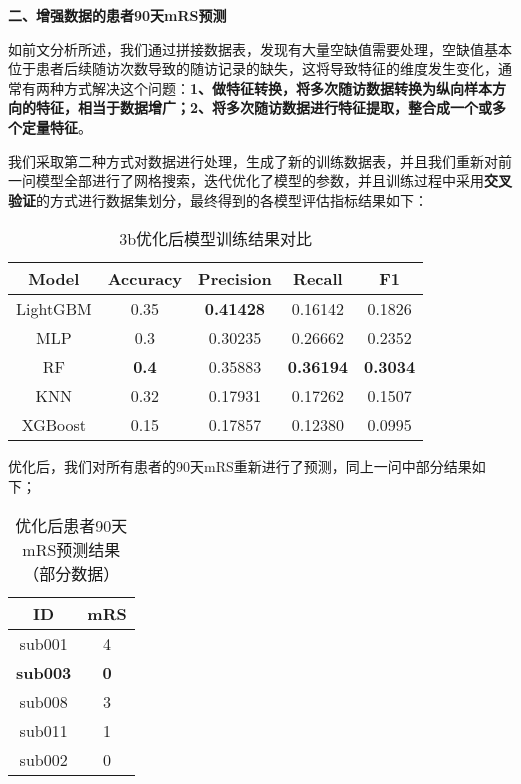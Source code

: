 \documentclass[bwprint]{gmcmthesis}
\begin{document}
				\textbf{二、增强数据的患者90天mRS预测}
				
				如前文分析所述，我们通过拼接数据表，发现有大量空缺值需要处理，空缺值基本位于患者后续随访次数导致的随访记录的缺失，这将导致特征的维度发生变化，通常有两种方式解决这个问题：\textbf{1、做特征转换，将多次随访数据转换为纵向样本方向的特征，相当于数据增广；2、将多次随访数据进行特征提取，整合成一个或多个定量特征}。
				
				我们采取第二种方式对数据进行处理，生成了新的训练数据表，并且我们重新对前一问模型全部进行了网格搜索，迭代优化了模型的参数，并且训练过程中采用\textbf{交叉验证}的方式进行数据集划分，最终得到的各模型评估指标结果如下：
				
				\begin{table}[H]
					\centering
					\caption{3b优化后模型训练结果对比}
					\label{tab:15}
					\setlength{\tabcolsep}{7mm}
					\begin{tabular}{|c|c|c|c|c|}
						\hline
						\rowcolor{green!30} Model & Accuracy & Precision &Recall & F1 \\ \hline
						\rowcolor{green!5}LightGBM & 0.35  & \textbf{0.41428} & 0.16142 & 0.1826\\ \hline
						\rowcolor{white!5}MLP & 0.3  & 0.30235
						& 0.26662 & 0.2352\\ \hline
						\rowcolor{green!5}RF & \textbf{0.4}  & 0.35883
						& \textbf{0.36194} & \textbf{0.3034}\\ \hline
						\rowcolor{white!5}KNN & 0.32  & 0.17931
						& 0.17262 & 0.1507\\ \hline
						\rowcolor{green!5}XGBoost& 0.15 & 0.17857  & 0.12380 & 0.0995 \\ \hline
					\end{tabular}
				\end{table}
				
				优化后，我们对所有患者的90天mRS重新进行了预测，同上一问中部分结果如下；
				
				\begin{table}[H]
					\centering
					\label{tab:16}
					\caption{优化后患者90天mRS预测结果（部分数据）}
					\setlength{\tabcolsep}{17mm}
					\begin{tabular}{|c|c|}
						\hline
						\rowcolor{blue!25} ID & mRS \\ \hline
						\rowcolor{blue!5}sub001 & 4 \\ \hline
						\rowcolor{white!5}\textbf{sub003} & \textbf{0}\\ \hline
						\rowcolor{blue!5}sub008 & 3 \\ \hline
						\rowcolor{white!5}sub011 & 1  \\ \hline
						\rowcolor{blue!5}sub002 & 0  \\ \hline
					\end{tabular}
				\end{table}
				
\end{document}
